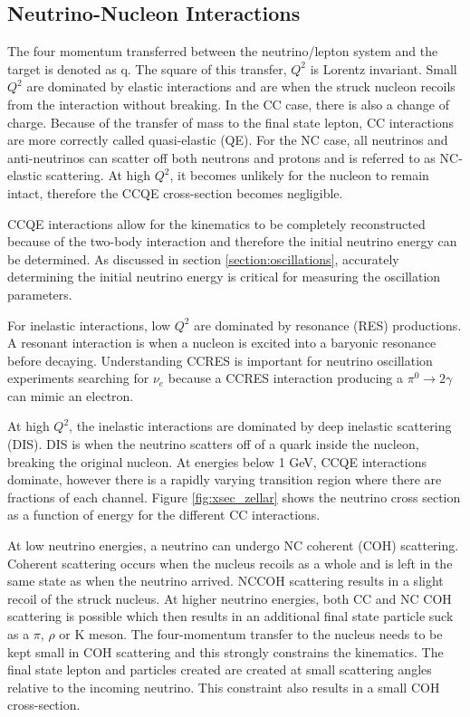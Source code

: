 \subsection{Neutrino-Nucleon Interactions}
The four momentum transferred between the neutrino/lepton system and the target is denoted as q. The square of this transfer, $Q^2$ is Lorentz invariant. Small $Q^2$ are dominated by elastic interactions and are when the struck nucleon recoils from the interaction without breaking. In the CC case, there is also a change of charge. Because of the transfer of mass to the final state lepton, CC interactions are more correctly called quasi-elastic (QE). For the NC case, all neutrinos and anti-neutrinos can scatter off both neutrons and protons and is referred to as NC-elastic scattering. At high $Q^2$, it becomes unlikely for the nucleon to remain intact, therefore the CCQE cross-section becomes negligible. 

CCQE interactions allow for the kinematics to be completely reconstructed because of the two-body interaction and therefore the initial neutrino energy can be determined. As discussed in section \ref{section:oscillations}, accurately determining the initial neutrino energy is critical for measuring the oscillation parameters. 

For inelastic interactions, low $Q^2$ are dominated by resonance (RES) productions. A resonant interaction is when a nucleon is excited into a baryonic resonance before decaying. Understanding CCRES is important for neutrino oscillation experiments searching for $\nu_e$ because a CCRES interaction producing a $\pi^0\rightarrow2\gamma$ can mimic an electron. 

At high $Q^2$, the inelastic interactions are dominated by deep inelastic scattering (DIS). DIS is when the neutrino scatters off of a quark inside the nucleon, breaking the original nucleon. At energies below 1 GeV, CCQE interactions dominate, however there is a rapidly varying transition region where there are fractions of each channel. Figure \ref{fig:xsec_zellar} \cite{zellar} shows the neutrino cross section as a function of energy for the different CC interactions. 

At low neutrino energies, a neutrino can undergo NC coherent (COH) scattering. Coherent scattering occurs when the nucleus recoils as a whole and is left in the same state as when the neutrino arrived. NCCOH scattering results in a slight recoil of the struck nucleus. At higher neutrino energies, both CC and NC COH scattering is possible which then results in an additional final state particle suck as a $\pi$, $\rho$ or K meson. The four-momentum transfer to the nucleus needs to be kept small in COH scattering and this strongly constrains the kinematics. The final state lepton and particles created are created at small scattering angles relative to the incoming neutrino. This constraint also results in a small COH cross-section. 

